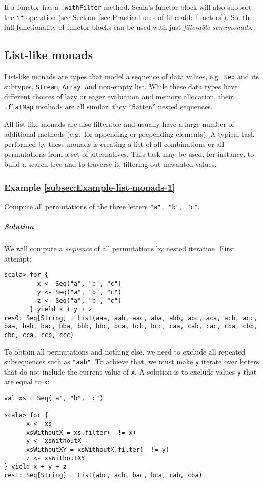 If a functor has a \lstinline!.withFilter! method, Scala\textsf{'}s functor
block will also support the \lstinline!if! operation (see Section~\ref{sec:Practical-uses-of-filterable-functors}).
So, the full functionality of functor blocks can be used with just
\emph{filterable semimonads}.

\subsection{List-like monads}

List-like monads are types that model a sequence of data values, e.g.~\lstinline!Seq!
and its subtypes, \lstinline!Stream!, \lstinline!Array!, and non-empty
list. While these data types have different choices of lazy or eager
evaluation and memory allocation, their \lstinline!.flatMap! methods
are all similar: they \textsf{``}flatten\textsf{''} nested sequences.

All list-like monads are also filterable and usually have a large
number of additional methods (e.g.~for appending or prepending elements).
A typical task performed by these monads is creating a list of all
combinations or all permutations from a set of alternatives. This
task may be used, for instance, to build a search tree and to traverse
it, filtering out unwanted values.

\subsubsection{Example \label{subsec:Example-list-monads-1}\ref{subsec:Example-list-monads-1}}

Compute all permutations of the three letters \lstinline!"a", "b", "c"!. 

\subparagraph{Solution}

We will compute a \emph{sequence} of all permutations by nested iteration.
First attempt:
\begin{lstlisting}
scala> for {
         x <- Seq("a", "b", "c")
         y <- Seq("a", "b", "c")
         z <- Seq("a", "b", "c")
       } yield x + y + z
res0: Seq[String] = List(aaa, aab, aac, aba, abb, abc, aca, acb, acc, baa, bab, bac, bba, bbb, bbc, bca, bcb, bcc, caa, cab, cac, cba, cbb, cbc, cca, ccb, ccc)
\end{lstlisting}
To obtain all permutations and nothing else, we need to exclude all
repeated subsequences such as \lstinline!"aab"!. To achieve that,
we must make \lstinline!y! iterate over letters that do not include
the current value of \lstinline!x!. A solution is to exclude values
\lstinline!y! that are equal to \lstinline!x!:
\begin{lstlisting}
val xs = Seq("a", "b", "c")

scala> for {
      x <- xs
      xsWithoutX = xs.filter(_ != x)
      y <- xsWithoutX
      xsWithoutXY = xsWithoutX.filter(_ != y)
      z <- xsWithoutXY
} yield x + y + z
res1: Seq[String] = List(abc, acb, bac, bca, cab, cba) 
\end{lstlisting}


